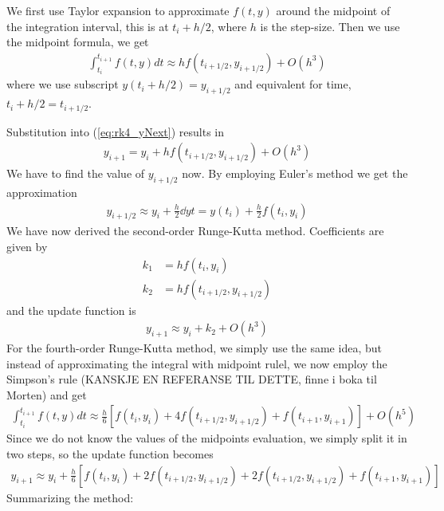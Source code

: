 \documentclass[a4paper, 10pt]{article}
\begin{document}
\newpage
 We first use Taylor expansion to approximate $f(t,y)$ around the midpoint of
 the integration interval, this is at $t_{i}+ h/2$, where $h$ is the step-size.
 Then we use the midpoint formula, we get
 \begin{align*}
   \int_{t_{i}}^{t_{i+1}} f(t,y) dt \approx h f(t_{i+1/2}, y_{i+1/2}) + O(h^{3})
 \end{align*}
 where we use subscript $y(t_{i}+h/2) = y_{i+1/2}$ and equivalent for time,
 $t_{i} + h/2 = t_{i+1/2}$.

 Substitution into (\ref{eq:rk4_yNext}) results in
 \begin{align*}
   y_{i+1} = y_{i} + h f(t_{i+1/2},y_{i+1/2}) + O(h^{3})
 \end{align*}
  We have to find the value of $y_{i+1/2}$ now. By employing Euler's method we
  get the approximation
  \begin{align*}
	y_{i+1/2} \approx  y_{i} + \frac{h}{2}\dd{y}{t} = y(t_{i}) + \frac{h}{2} f(t_{i}, y_{i})
  \end{align*}
  We have now derived the second-order Runge-Kutta method. Coefficients are
  given by
  \begin{align*}
	k_{1} &= h f(t_{i}, y_{i}) \\
    k_{2} &= h f(t_{i+1/2}, y_{i+1/2})
  \end{align*}
  and the update function is
  \begin{align*}
	y_{i+1} \approx y_{i} + k_{2} + O(h^{3})
  \end{align*}
  For the fourth-order Runge-Kutta method, we simply use the same idea, but
  instead of approximating the integral with midpoint rulel, we now employ the
  Simpson's rule (KANSKJE EN REFERANSE TIL DETTE, finne i boka til Morten) and
  get
  \begin{align*}
	\int_{t_{i}}^{t_{i+1}} f(t,y)dt  \approx  \frac{h}{6}\left[f(t_{i},y_{i}) +
    4f(t_{i+1/2}, y_{i+1/2}) + f(t_{i+1}, y_{i+1})\right] + O(h^{5})
  \end{align*}
  Since we do not know the values of the midpoints evaluation, we simply split
  it in two steps, so the update function becomes
  \begin{align*}
	y_{i+1} \approx y_{i} + \frac{h}{6}\left[f(t_{i},y_{i}) + 2f(t_{i+1/2},
    y_{i+1/2}) + 2f(t_{i+1/2}, y_{i+1/2}) + f(t_{i+1},y_{i+1})\right]
  \end{align*}
  Summarizing the method:
\end{document}
